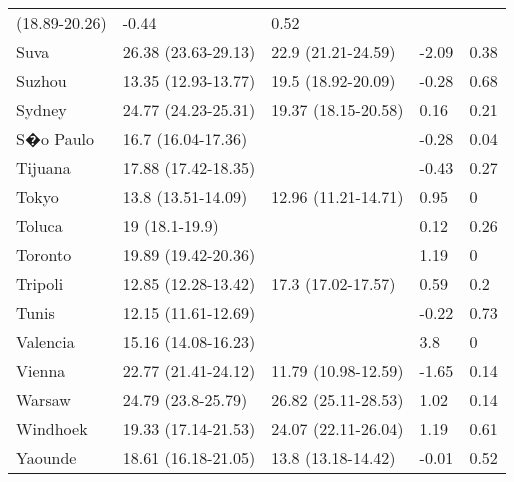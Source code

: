 \begin{longtable}{lllll}
 (18.89-20.26) & -0.44 & 0.52 \\ 
  Suva & 26.38
 (23.63-29.13) & 22.9
 (21.21-24.59) & -2.09 & 0.38 \\ 
  Suzhou & 13.35
 (12.93-13.77) & 19.5
 (18.92-20.09) & -0.28 & 0.68 \\ 
  Sydney & 24.77
 (24.23-25.31) & 19.37
 (18.15-20.58) & 0.16 & 0.21 \\ 
  S�o Paulo & 16.7
 (16.04-17.36) &  & -0.28 & 0.04 \\ 
  Tijuana & 17.88
 (17.42-18.35) &  & -0.43 & 0.27 \\ 
  Tokyo & 13.8
 (13.51-14.09) & 12.96
 (11.21-14.71) & 0.95 & 0 \\ 
  Toluca & 19
 (18.1-19.9) &  & 0.12 & 0.26 \\ 
  Toronto & 19.89
 (19.42-20.36) &  & 1.19 & 0 \\ 
  Tripoli & 12.85
 (12.28-13.42) & 17.3
 (17.02-17.57) & 0.59 & 0.2 \\ 
  Tunis & 12.15
 (11.61-12.69) &  & -0.22 & 0.73 \\ 
  Valencia & 15.16
 (14.08-16.23) &  & 3.8 & 0 \\ 
  Vienna & 22.77
 (21.41-24.12) & 11.79
 (10.98-12.59) & -1.65 & 0.14 \\ 
  Warsaw & 24.79
 (23.8-25.79) & 26.82
 (25.11-28.53) & 1.02 & 0.14 \\ 
  Windhoek & 19.33
 (17.14-21.53) & 24.07
 (22.11-26.04) & 1.19 & 0.61 \\ 
  Yaounde & 18.61
 (16.18-21.05) & 13.8
 (13.18-14.42) & -0.01 & 0.52 \\ 
   \hline
\hline
\end{longtable}
